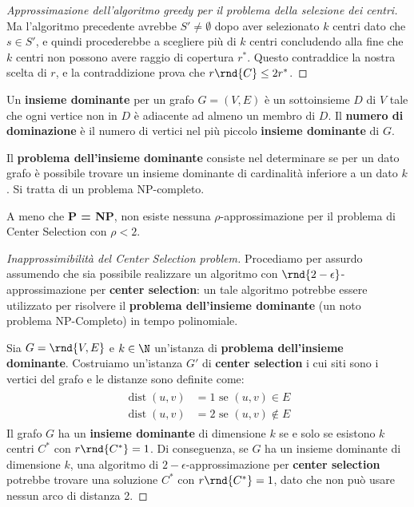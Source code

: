 \documentclass[\main/main.tex]{subfiles}
\begin{document}
\begin{multicols}{2}
\begin{proof}[Approssimazione dell'algoritmo greedy per il problema della selezione dei centri]
    Ma l'algoritmo precedente avrebbe \(S' \neq \emptyset\) dopo aver selezionato \(k\) centri dato che \(s \in S'\), e quindi procederebbe a scegliere più di \(k\) centri concludendo alla fine che \(k\) centri non possono avere raggio di copertura \(r^*\). Questo contraddice la nostra scelta di \(r\), e la contraddizione prova che \(r\rnd{C} \leq 2r^*\).
\end{proof}
\begin{problem}
    Un \textbf{insieme dominante} per un grafo \(G = (V, E)\) è un sottoinsieme \(D\) di \(V\) tale che ogni vertice non in \(D\) è adiacente ad almeno un membro di \(D\). Il \textbf{numero di dominazione} è il numero di vertici nel più piccolo \textbf{insieme dominante} di \(G\).
    
    Il \textbf{problema dell'insieme dominante} consiste nel determinare se per un dato grafo è possibile trovare un insieme dominante di cardinalità inferiore a un dato \(k\). Si tratta di un problema NP-completo.
\end{problem}
\begin{theorem}
    A meno che \textbf{P = NP}, non esiste nessuna \(\rho\)-approssimazione per il problema di Center Selection con \(\rho<2\).
\end{theorem}
\begin{proof}[Inapprossimibilità del Center Selection problem]
    Procediamo per assurdo assumendo che sia possibile realizzare un algoritmo con \(\rnd{2-\epsilon}\)-approssimazione per \textbf{center selection}: un tale algoritmo potrebbe essere utilizzato per risolvere il \textbf{problema dell'insieme dominante} (un noto problema NP-Completo) in tempo polinomiale.
    
    Sia \(G=\rnd{V, E}\) e \(k\in\N\) un'istanza di \textbf{problema dell'insieme dominante}. Costruiamo un'istanza \(G'\) di \textbf{center selection} i cui siti sono i vertici del grafo e le distanze sono definite come:
    \begin{align*}
        \begin{aligned}
            \operatorname{dist}(u, v) &=1 \text { se }(u, v) \in E \\
            \operatorname{dist}(u, v) &=2 \text { se }(u, v) \notin E
        \end{aligned}
    \end{align*}
    Il grafo \(G\) ha un \textbf{insieme dominante} di dimensione \(k\) se e solo se esistono \(k\) centri \(C^*\) con \(r\rnd{C^*} = 1\). Di conseguenza, se \(G\) ha un insieme dominante di dimensione \(k\), una algoritmo di \(2-\epsilon\)-approssimazione per \textbf{center selection} potrebbe trovare una soluzione \(C^*\) con \(r\rnd{C^*} = 1\), dato che non può usare nessun arco di distanza 2.
\end{proof}
\end{multicols}
\clearpage
\end{document}
